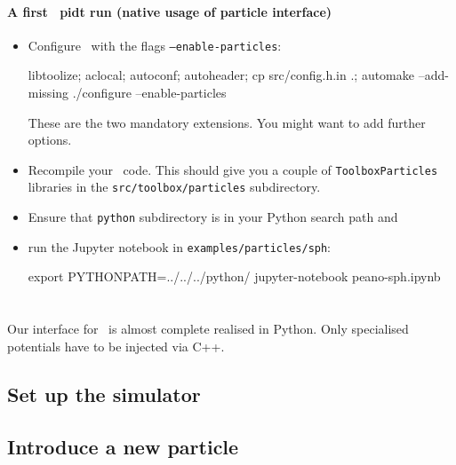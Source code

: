 \begin{framed}
\paragraph*{A first \Peano\ pidt run (native usage of particle interface)}
\begin{itemize}
  \item Configure \Peano\ with the flags \texttt{--enable-particles}:
  \begin{code}
libtoolize; aclocal; autoconf; autoheader; cp src/config.h.in .; automake --add-missing
./configure --enable-particles
  \end{code}
   These are the two mandatory extensions. You might want to add further options.
  \item Recompile your \Peano\ code. This should give you a couple of
  \texttt{ToolboxParticles} libraries in the \texttt{src/toolbox/particles}
  subdirectory.
  \item Ensure that \texttt{python} subdirectory is in your Python search path
  and
  \item run the Jupyter notebook in \texttt{examples/particles/sph}: 
  \begin{code}
export PYTHONPATH=../../../python/
jupyter-notebook peano-sph.ipynb
  \end{code}
\end{itemize}
\end{framed}


\section{\Swift}

Our interface for \Swift\ is almost complete realised in Python.
Only specialised potentials have to be injected via C++.


\subsection{Set up the simulator}


\subsection{Introduce a new particle}

